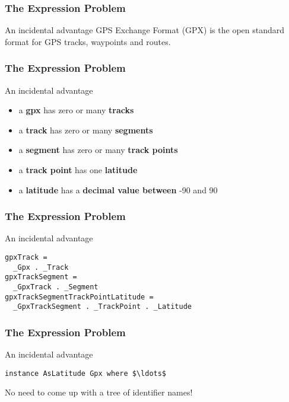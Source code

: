 \begin{frame}[fragile]
\frametitle{The Expression Problem}
\begin{block}{An incidental advantage}
GPS Exchange Format (GPX) is the open standard format for GPS tracks,
waypoints and routes.
\end{block}
\end{frame}

\begin{frame}[fragile]
\frametitle{The Expression Problem}
\begin{block}{An incidental advantage}
\begin{itemize}
\item a \textbf{gpx} has zero or many \textbf{tracks}
\item a \textbf{track} has zero or many \textbf{segments}
\item a \textbf{segment} has zero or many \textbf{track points}
\item a \textbf{track point} has one \textbf{latitude}
\item a \textbf{latitude} has a \textbf{decimal value between} -90 and 90
\end{itemize}
\end{block}
\end{frame}

\begin{frame}[fragile]
\frametitle{The Expression Problem}
\begin{block}{An incidental advantage}
\begin{lstlisting}[style=haskell,mathescape]
gpxTrack =
  _Gpx . _Track
gpxTrackSegment =
  _GpxTrack . _Segment
gpxTrackSegmentTrackPointLatitude =
  _GpxTrackSegment . _TrackPoint . _Latitude
\end{lstlisting}
\end{block}
\end{frame}

\begin{frame}[fragile]
\frametitle{The Expression Problem}
\begin{block}{An incidental advantage}
\begin{lstlisting}[style=haskell,mathescape]
instance AsLatitude Gpx where $\ldots$
\end{lstlisting}
No need to come up with a tree of identifier names!
\end{block}
\end{frame}


